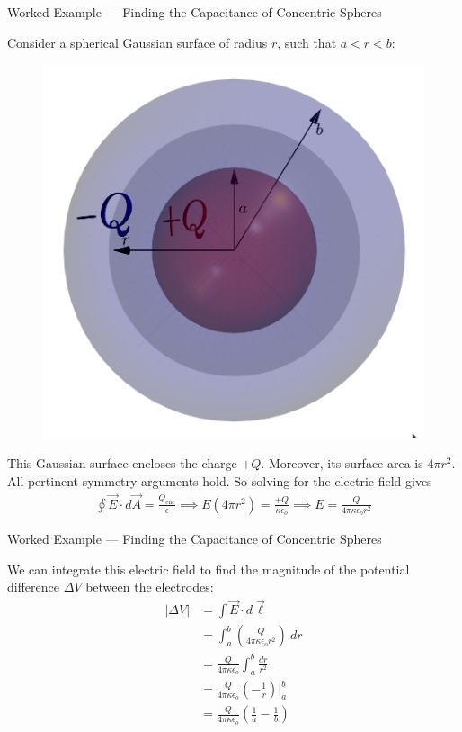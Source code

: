 \documentclass{beamer}
\begin{document}
\begin{frame}{Worked Example --- Finding the Capacitance of Concentric Spheres}

Consider a spherical Gaussian surface of radius $r$, such that $a < r < b$:

\begin{figure}
\centering
\includegraphics[height=0.36\textheight]{figures/tree.png}
\end{figure}

This Gaussian surface encloses the charge $+Q$. Moreover, its surface area is $4\pi r^2$. All pertinent symmetry arguments hold. So solving for the electric field gives
\begin{gather*}
    \oint \vec{E} \cdot d\vec{A} = \frac{Q_{\text{enc}}}{\epsilon} \implies E \left( 4\pi r^2 \right) = \frac{+Q}{\kappa \epsilon_o} \implies E = \frac{Q}{4\pi \kappa \epsilon_o r^2}
\end{gather*}

\end{frame}

\begin{frame}{Worked Example --- Finding the Capacitance of Concentric Spheres}

We can integrate this electric field to find the magnitude of the potential difference $\Delta V$ between the electrodes:
\begin{align*}
    \big| \Delta V \big| &= \int \vec{E} \cdot d\vec{\ell} \\
    &= \int_a^b \left( \frac{Q}{4\pi \kappa \epsilon_o r^2} \right)\ dr \\
    &= \frac{Q}{4\pi\kappa\epsilon_o} \int_a^b \frac{dr}{r^2} \\
    &= \frac{Q}{4\pi\kappa\epsilon_o} \left( -\frac{1}{r} \right) \bigg|_{a}^{b} \\
    &= \frac{Q}{4\pi\kappa\epsilon_o} \left( \frac{1}{a} - \frac{1}{b} \right)
\end{align*}

\end{frame}
\end{document}
